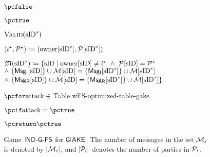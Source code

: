 \begin{figure}[h!]
{{\begin{minipage}[t]{\textwidth}
\begin{nicodemus}[1]
					\item \quad \pcreturn $\pcfalse$ 
					\item \pcreturn $\pctrue$\\
				\end{nicodemus}
				\underline{$\ValidAttackO(\sID^*)$}
				\begin{nicodemus}
					\item $({i}^\star, \GakeUSet^\star) := (\owner[\sID^*], \GakeUSet[\sID^*])$						
					\item $\matchingSessions \coloneqq \{\sID \mid   \owner[\sID] \neq  {i}^\star~ \wedge ~ \GakeUSet[\sID]= \GakeUSet^\star ~$\\ 
					\hspace*{2em}$ \wedge~\changehighlight{\{\GIniMes[\sID]\}} \cup \GIniMesSet[\sID] = \changehighlight{\{\GIniMes[\sID^*]\}}\cup \GIniMesSet[\sID^*] ~$\\
					\hspace*{2em}$ \wedge~\changehighlight{\{\GResMes[\sID]\}} \cup \GResMesSet[\sID] = \changehighlight{\{\GResMes[\sID^*]\}}\cup \GResMesSet[\sID^*]\}$ 
					\item $\pcfor \attack\in$\hspace*{-0.1em} Table wFS-optimized-table-gake
					\item \quad $\pcif \attack=\pctrue~ $
					\item \quad \quad $\pcreturn \pctrue$\label{line:attack-true-2-gake}
					\item \pcreturn \pcfalse
				\end{nicodemus}
			\end{minipage}
	}}
	\caption{
		Game $\GIAKEsecurityPFSGame$ for $\GIAKE$.
		The number of messages in the set $\GakeIniMesSet[\GakeUId]$ is denoted by $|\GakeIniMesSet[\GakeUId]|$, and 
		$|\peers_\GakeUId|$ denotes the number of parties in $\peers_\GakeUId$.
		\label{fig:game-ind-atk-gake}}
\end{figure}


